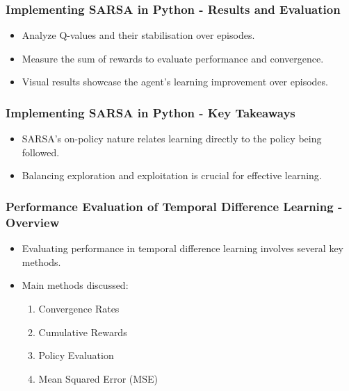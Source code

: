 \documentclass[aspectratio=169]{beamer}
\begin{document}
\begin{frame}
    \frametitle{Implementing SARSA in Python - Results and Evaluation}
    \begin{itemize}
        \item Analyze Q-values and their stabilisation over episodes.
        \item Measure the sum of rewards to evaluate performance and convergence.
        \item Visual results showcase the agent's learning improvement over episodes.
    \end{itemize}
\end{frame}

\begin{frame}
    \frametitle{Implementing SARSA in Python - Key Takeaways}
    \begin{itemize}
        \item SARSA's on-policy nature relates learning directly to the policy being followed.
        \item Balancing exploration and exploitation is crucial for effective learning.
    \end{itemize}
\end{frame}

\begin{frame}[fragile]
    \frametitle{Performance Evaluation of Temporal Difference Learning - Overview}
    \begin{itemize}
        \item Evaluating performance in temporal difference learning involves several key methods.
        \item Main methods discussed:
        \begin{enumerate}
            \item Convergence Rates
            \item Cumulative Rewards
            \item Policy Evaluation
            \item Mean Squared Error (MSE)
        \end{enumerate}
    \end{itemize}
\end{frame}
\end{document}
